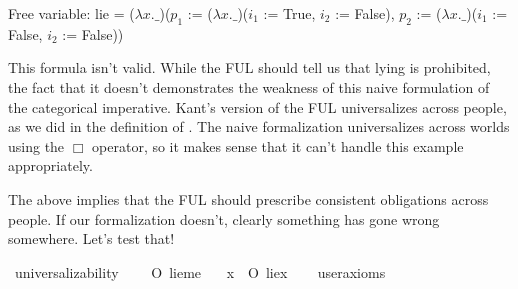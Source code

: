 \begin{isabellebody}
{  Free variable:
    lie = ($\lambda x. \_$)($p_1$ := ($\lambda x. \_$)($i_1$ := True, $i_2$ := False), $p_2$ := ($\lambda x. \_$)($i_1$ := False, $i_2$ := False)) \color{black}%
}\isanewline
%
\isanewline
%
%
\endisatagproof
{\isafoldproof}%
%
\isadelimproof
%
\endisadelimproof
%
\begin{isamarkuptext}%
This formula isn't valid. While the FUL should tell us that lying is prohibited, the fact that it 
doesn't demonstrates the weakness of this naive formulation of the categorical imperative. Kant's version of
the FUL universalizes across people, as we did in the definition of . The 
naive formalization universalizes across worlds using the $\Box$ operator, so it makes sense that it can't
handle this example appropriately.

The above implies that the FUL should prescribe consistent obligations across people. If our formalization
doesn't, clearly something has gone wrong somewhere. Let's test that!%
\end{isamarkuptext}\isamarkuptrue%
\isamarkupfalse%
\ universalizability{\isacharcolon}\isanewline
\ \ \ {\isachardoublequoteopen}{\isasymTurnstile}\ O\ {\isacharbraceleft}{\isacharparenleft}lie{\isacharparenleft}me{\isacharparenright}{\isacharparenright}{\isacharbraceright}{\isachardoublequoteclose}\isanewline
\ \ \ {\isachardoublequoteopen}{\isasymforall}x{\isachardot}\ {\isasymTurnstile}\ {\isacharparenleft}O\ {\isacharbraceleft}{\isacharparenleft}lie{\isacharparenleft}x{\isacharparenright}{\isacharparenright}{\isacharbraceright}{\isacharparenright}{\isachardoublequoteclose}\isanewline
\ \ \isamarkupfalse%
\ {\isacharbrackleft}user{\isacharunderscore}axioms{\isacharbrackright}%
\isadelimproof
\ %
\endisadelimproof
%
\isatagproof
{}\isamarkupfalse%
\isanewline
%
\end{isabellebody}

